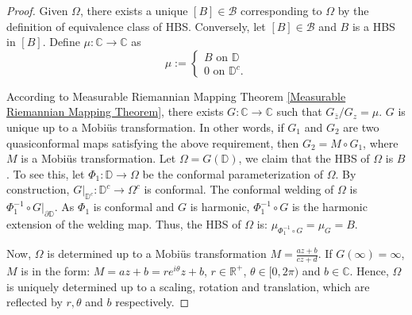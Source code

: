 \documentclass[review,onefignum,onetabnum]{siamonline190516}
\begin{document}
\begin{proof}
Given $\Omega$, there exists a unique $[B]\in \mathcal{B}$ corresponding to $\Omega$ by the definition of equivalence class of HBS. Conversely, let $[B]\in \mathcal{B}$ and $B$ is a HBS in $[B]$. Define $\mu:\mathbb{C}\to \mathbb{C}$ as
\begin{equation}\label{reconstructionmu}
\mu := \begin{cases}
B \text{ on }\mathbb{D}\\
0 \text{ on }\mathbb{D}^c.
\end{cases}
\end{equation}

According to Measurable Riemannian Mapping Theorem \ref{Measurable Riemannian Mapping Theorem}, there exists $G:\mathbb{C}\to \mathbb{C}$ such that $G_{\bar{z}}/G_z = \mu$. $G$ is unique up to a Mobi\"us transformation. In other words, if $G_1$ and $G_2$ are two quasiconformal maps satisfying the above requirement, then $G_2=M\circ G_1$, where $M$ is a Mobi\"us transformation. Let $\Omega = G(\mathbb{D})$, we claim that the HBS of $\Omega$ is $B$. To see this, let $\Phi_1: \mathbb{D}\to \Omega$ be the conformal parameterization of $\Omega$. By construction, $G|_{\mathbb{D}^c}: \mathbb{D}^c\to \Omega^c$ is conformal. The conformal welding of $\Omega$ is $\Phi_1^{-1}\circ G|_{\partial\mathbb{D}}$. As $\Phi_1$ is conformal and $G$ is harmonic, $\Phi_1^{-1}\circ G$ is the harmonic extension of the welding map. Thus, the HBS of $\Omega$ is: $\mu_{\Phi_1^{-1}\circ G}=\mu_G = B$.

Now, $\Omega$ is determined up to a Mobi\"us transformation $M=\frac{az+b}{cz+d}$. If $G(\infty) = \infty$, $M$ is in the form: $M = az+b= re^{i\theta}z +b$, $r\in \mathbb{R}^+$, $\theta \in [0,2\pi)$ and $b\in \mathbb{C}$. Hence, $\Omega$ is uniquely determined up to a scaling, rotation and translation, which are reflected by $r, \theta$ and $b$ respectively. 


\end{proof}
\end{document}
